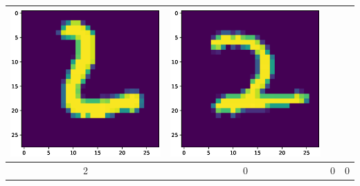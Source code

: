 \documentclass{article}
\begin{document}
\begin{tabular}{cccc}
\includegraphics[scale=.1]{fig/MNIST_392_2_2_424_2.eps}&
\includegraphics[scale=.1]{fig/MNIST_392_2_3_609_2.eps}
\\
\hline 
2 & 0 & 0 & 0 \\


\end{tabular}
\end{document}
